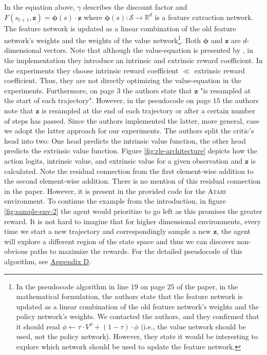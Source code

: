 \documentclass[10pt]{article} %
\begin{document}
\noindent In the equation above, $\gamma$ describes the discount factor and $F(s_{t+1}, \textbf{z}) =  \boldsymbol{\phi}(s) \cdot \textbf{z}$ where $\boldsymbol{\phi}(s): \mathcal{S} \rightarrow \mathbb{R}^{d}$ is a feature extraction network. The feature network is updated as a linear combination of the old feature network's weights and the weights of the value network\footnote{In the pseudocode algorithm in line $19$ on page $25$ of the paper, in the mathematical formulation, the authors state that the feature network is updated as a linear combination of the old feature network's weights and the policy network's weights. We contacted the authors, and they confirmed that it should read $\phi \leftarrow \tau \cdot V^\phi + (1 - \tau ) \cdot \phi$ (i.e., the value network should be used, not the policy network). However, they state it would be interesting to explore which network should be used to update the feature network.}. Both $\boldsymbol{\phi}$ and $\textbf{z}$ are $d$-dimensional vectors. Note that although the value-equation is presented by \cite{rle-paper}, in the implementation they introduce an intrinsic and extrinsic reward coefficient. In the experiments they choose intrinsic reward coefficient $\ll$ extrinsic reward coefficient. Thus, they are not directly optimizing the value-equation in the experiments. Furthermore, on page $3$ the authors state that $\textbf{z}$ "is resampled at the start of each trajectory". However, in the pseudocode on page $15$ the authors note that $\textbf{z}$ is resampled at the end of each trajectory or after a certain number of steps has passed. Since the authors implemented the latter, more general, case we adopt the latter approach for our experiments. The authors split the critic's head into two: One head predicts the intrinsic value function, the other head predicts the extrinsic value function. Figure \ref{fig:rle-architecture} depicts how the action logits, intrinsic value, and extrinsic value for a given observation and $\textbf{z}$ is calculated. Note the residual connection from the first element-wise addition to the second element-wise addition. There is no mention of this residual connection in the paper. However, it is present in the provided code for the \textsc{Atari} environment. To continue the example from the introduction, in figure \ref{fig:sample-env-2} the agent would prioritize to go left as this promises the greater reward. It is not hard to imagine that for higher dimensional environments, every time we start a new trajectory and correspondingly sample a new $\textbf{z}$, the agent will explore a different region of the state space and thus we can discover non-obvious paths to maximize the rewards. For the detailed pseudocode of this algorithm, see \hyperlink{link-rle}{Appendix D}.
\end{document}
